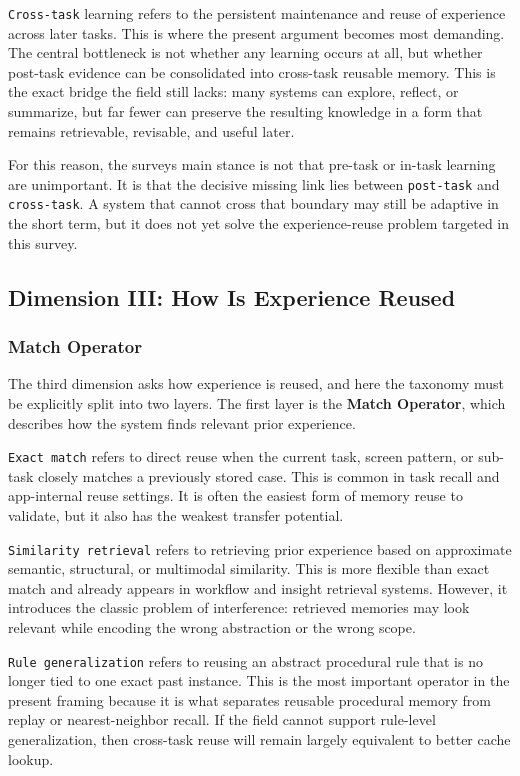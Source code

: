 \documentclass{article}
\begin{document}
\texttt{Cross-task} learning refers to the persistent maintenance and
reuse of experience across later tasks. This is where the present
argument becomes most demanding. The central bottleneck is not whether
any learning occurs at all, but whether post-task evidence can be
consolidated into cross-task reusable memory. This is the exact bridge
the field still lacks: many systems can explore, reflect, or summarize,
but far fewer can preserve the resulting knowledge in a form that
remains retrievable, revisable, and useful later.

For this reason, the survey\textquotesingle s main stance is not that
pre-task or in-task learning are unimportant. It is that the decisive
missing link lies between \texttt{post-task} and \texttt{cross-task}. A
system that cannot cross that boundary may still be adaptive in the
short term, but it does not yet solve the experience-reuse problem
targeted in this survey.

\subsection{Dimension III: How Is Experience Reused}\label{43-dimension-iii-how-is-experience-reused}

\subsubsection{Match Operator}\label{431-match-operator}

The third dimension asks how experience is reused, and here the taxonomy
must be explicitly split into two layers. The first layer is the
\textbf{Match Operator}, which describes how the system finds relevant
prior experience.

\texttt{Exact\ match} refers to direct reuse when the current task,
screen pattern, or sub-task closely matches a previously stored case.
This is common in task recall and app-internal reuse settings. It is
often the easiest form of memory reuse to validate, but it also has the
weakest transfer potential.

\texttt{Similarity\ retrieval} refers to retrieving prior experience
based on approximate semantic, structural, or multimodal similarity.
This is more flexible than exact match and already appears in workflow
and insight retrieval systems. However, it introduces the classic
problem of interference: retrieved memories may look relevant while
encoding the wrong abstraction or the wrong scope.

\texttt{Rule\ generalization} refers to reusing an abstract procedural
rule that is no longer tied to one exact past instance. This is the most
important operator in the present framing because it is what separates
reusable procedural memory from replay or nearest-neighbor recall. If
the field cannot support rule-level generalization, then cross-task
reuse will remain largely equivalent to better cache lookup.
\end{document}
